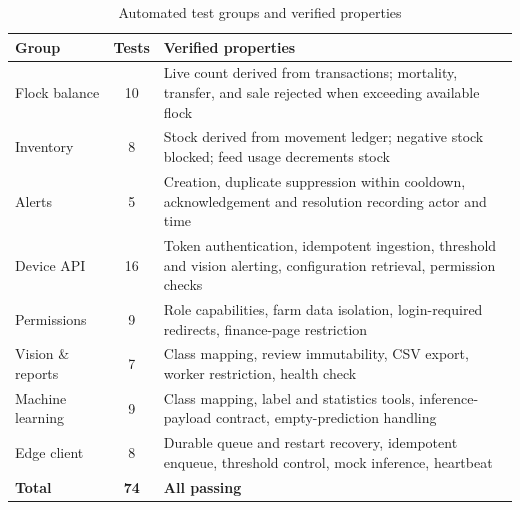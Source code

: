 \documentclass[12pt,a4paper]{report}
\begin{document}
\begin{table}[H]
\centering
\caption{Automated test groups and verified properties}
\label{tab:testappendix}
\begin{tabularx}{\textwidth}{@{}l c X@{}}
\toprule
\textbf{Group} & \textbf{Tests} & \textbf{Verified properties} \\
\midrule
Flock balance & 10 & Live count derived from transactions; mortality, transfer, and sale rejected when exceeding available flock \\
Inventory & 8 & Stock derived from movement ledger; negative stock blocked; feed usage decrements stock \\
Alerts & 5 & Creation, duplicate suppression within cooldown, acknowledgement and resolution recording actor and time \\
Device API & 16 & Token authentication, idempotent ingestion, threshold and vision alerting, configuration retrieval, permission checks \\
Permissions & 9 & Role capabilities, farm data isolation, login-required redirects, finance-page restriction \\
Vision \& reports & 7 & Class mapping, review immutability, CSV export, worker restriction, health check \\
Machine learning & 9 & Class mapping, label and statistics tools, inference-payload contract, empty-prediction handling \\
Edge client & 8 & Durable queue and restart recovery, idempotent enqueue, threshold control, mock inference, heartbeat \\
\midrule
\textbf{Total} & \textbf{74} & \textbf{All passing} \\
\bottomrule
\end{tabularx}
\end{table}
\end{document}
